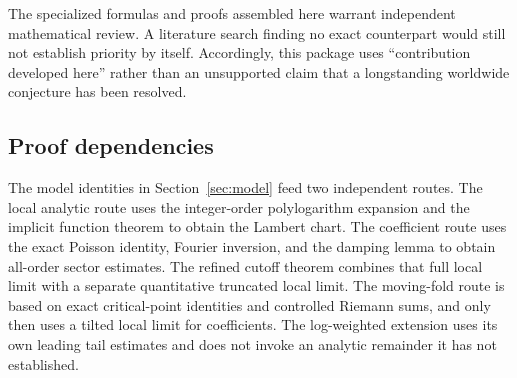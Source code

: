 \documentclass[11pt,a4paper]{article}
\numberwithin{equation}{section}
\theoremstyle{definition}
\theoremstyle{remark}
\begin{document}
The specialized formulas and proofs assembled here warrant independent
mathematical review. A literature search finding no exact counterpart
would still not establish priority by itself. Accordingly, this
package uses ``contribution developed here'' rather than an unsupported
claim that a longstanding worldwide conjecture has been resolved.

\subsection{Proof dependencies}
The model identities in Section~\ref{sec:model} feed two independent
routes. The local analytic route uses the integer-order polylogarithm
expansion and the implicit function theorem to obtain the Lambert
chart. The coefficient route uses the exact Poisson identity,
Fourier inversion, and the damping lemma to obtain all-order sector
estimates. The refined cutoff theorem combines that full local limit
with a separate quantitative truncated local limit. The moving-fold
route is based on exact critical-point identities and controlled
Riemann sums, and only then uses a tilted local limit for coefficients.
The log-weighted extension uses its own leading tail estimates and
does not invoke an analytic remainder it has not established.
\end{document}
